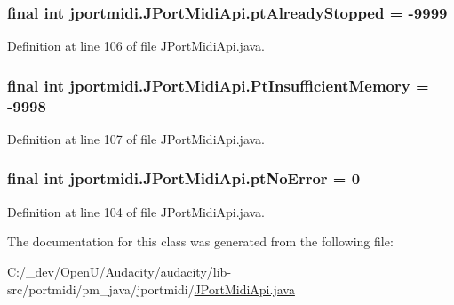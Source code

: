 \subsubsection[{\texorpdfstring{pt\+Already\+Stopped}{ptAlreadyStopped}}]{\setlength{\rightskip}{0pt plus 5cm}final {\bf int} jportmidi.\+J\+Port\+Midi\+Api.\+pt\+Already\+Stopped = -\/9999}\hypertarget{classjportmidi_1_1_j_port_midi_api_a7d2cb145d20312aac303ebab2cb173f3}{}\label{classjportmidi_1_1_j_port_midi_api_a7d2cb145d20312aac303ebab2cb173f3}


Definition at line 106 of file J\+Port\+Midi\+Api.\+java.

\subsubsection[{\texorpdfstring{Pt\+Insufficient\+Memory}{PtInsufficientMemory}}]{\setlength{\rightskip}{0pt plus 5cm}final {\bf int} jportmidi.\+J\+Port\+Midi\+Api.\+Pt\+Insufficient\+Memory = -\/9998}\hypertarget{classjportmidi_1_1_j_port_midi_api_aee4901bdad2e1272c8fe7eaf774db561}{}\label{classjportmidi_1_1_j_port_midi_api_aee4901bdad2e1272c8fe7eaf774db561}


Definition at line 107 of file J\+Port\+Midi\+Api.\+java.

\subsubsection[{\texorpdfstring{pt\+No\+Error}{ptNoError}}]{\setlength{\rightskip}{0pt plus 5cm}final {\bf int} jportmidi.\+J\+Port\+Midi\+Api.\+pt\+No\+Error = 0}\hypertarget{classjportmidi_1_1_j_port_midi_api_a30a51cec6a64c6c1db25bf9942217407}{}\label{classjportmidi_1_1_j_port_midi_api_a30a51cec6a64c6c1db25bf9942217407}


Definition at line 104 of file J\+Port\+Midi\+Api.\+java.



The documentation for this class was generated from the following file\+:\begin{DoxyCompactItemize}
\item 
C\+:/\+\_\+dev/\+Open\+U/\+Audacity/audacity/lib-\/src/portmidi/pm\+\_\+java/jportmidi/\hyperlink{_j_port_midi_api_8java}{J\+Port\+Midi\+Api.\+java}\end{DoxyCompactItemize}
